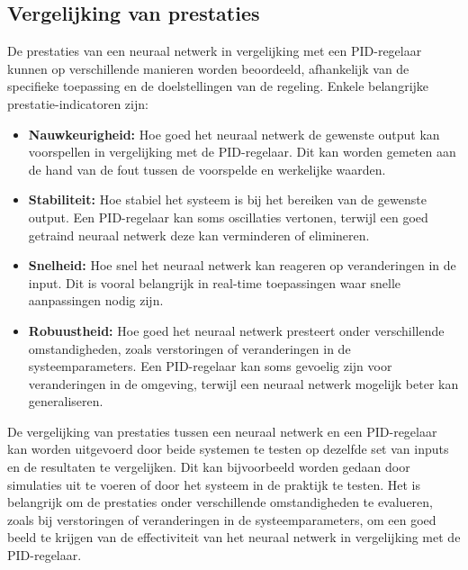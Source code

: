 \begin{itemize}
\subsection{Vergelijking van prestaties}
De prestaties van een neuraal netwerk in vergelijking met een PID-regelaar kunnen op verschillende manieren worden beoordeeld, afhankelijk van de specifieke toepassing en de doelstellingen van de regeling. Enkele belangrijke prestatie-indicatoren zijn:
\begin{itemize}
  \item \textbf{Nauwkeurigheid:} Hoe goed het neuraal netwerk de gewenste output kan voorspellen in vergelijking met de PID-regelaar. Dit kan worden gemeten aan de hand van de fout tussen de voorspelde en werkelijke waarden.
  \item \textbf{Stabiliteit:} Hoe stabiel het systeem is bij het bereiken van de gewenste output. Een PID-regelaar kan soms oscillaties vertonen, terwijl een goed getraind neuraal netwerk deze kan verminderen of elimineren.
  \item \textbf{Snelheid:} Hoe snel het neuraal netwerk kan reageren op veranderingen in de input. Dit is vooral belangrijk in real-time toepassingen waar snelle aanpassingen nodig zijn.
  \item \textbf{Robuustheid:} Hoe goed het neuraal netwerk presteert onder verschillende omstandigheden, zoals verstoringen of veranderingen in de systeemparameters. Een PID-regelaar kan soms gevoelig zijn voor veranderingen in de omgeving, terwijl een neuraal netwerk mogelijk beter kan generaliseren.
\end{itemize}
De vergelijking van prestaties tussen een neuraal netwerk en een PID-regelaar kan worden uitgevoerd door beide systemen te testen op dezelfde set van inputs en de resultaten te vergelijken. Dit kan bijvoorbeeld worden gedaan door simulaties uit te voeren of door het systeem in de praktijk te testen. Het is belangrijk om de prestaties onder verschillende omstandigheden te evalueren, zoals bij verstoringen of veranderingen in de systeemparameters, om een goed beeld te krijgen van de effectiviteit van het neuraal netwerk in vergelijking met de PID-regelaar.





\end{itemize}
